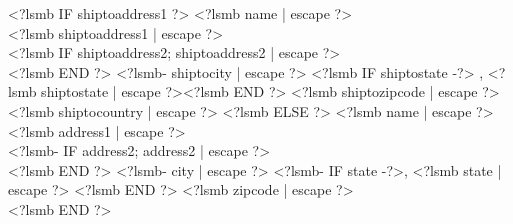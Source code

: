 \documentclass{scrartcl}
\begin{document}
<?lsmb IF shiptoaddress1 ?>
\noindent <?lsmb name | escape ?>\\
<?lsmb shiptoaddress1 | escape ?>\\
<?lsmb IF shiptoaddress2; shiptoaddress2 | escape ?>\\ <?lsmb END ?>
<?lsmb- shiptocity | escape ?>
<?lsmb IF shiptostate -?>
\hspace{-0.1cm}, <?lsmb shiptostate | escape ?><?lsmb END ?> <?lsmb shiptozipcode | escape ?>\\
<?lsmb shiptocountry | escape ?>
<?lsmb ELSE ?>
\noindent <?lsmb name | escape ?>\\
<?lsmb address1 | escape ?> \\
<?lsmb- IF address2; address2 | escape ?> \\<?lsmb END ?>
<?lsmb- city | escape ?>
<?lsmb- IF state -?>, <?lsmb state | escape ?> <?lsmb END ?> <?lsmb zipcode | escape ?>\\
<?lsmb END ?>
\end{document}
